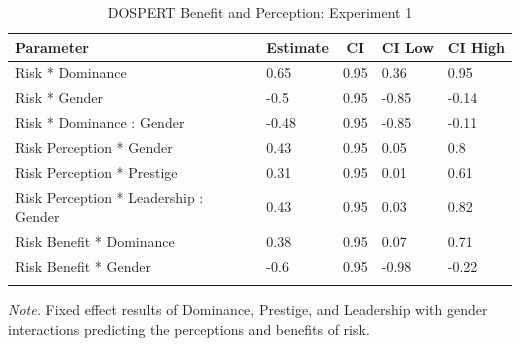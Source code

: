 \documentclass[
  donotrepeattitle,doc, 12pt, a4paper,floatsintext]{apa7}
\begin{document}
\begin{table}[p]

\begin{center}
\begin{threeparttable}

\caption{\label{tab:m5-int-fixef-exp-1}DOSPERT Benefit and Perception: Experiment 1}

\begin{tabular}{lllll}
\toprule
Parameter & \multicolumn{1}{c}{Estimate} & \multicolumn{1}{c}{CI} & \multicolumn{1}{c}{CI Low} & \multicolumn{1}{c}{CI High}\\
\midrule
Risk * Dominance & 0.65 & 0.95 & 0.36 & 0.95\\
Risk * Gender & -0.5 & 0.95 & -0.85 & -0.14\\
Risk * Dominance : Gender & -0.48 & 0.95 & -0.85 & -0.11\\
Risk Perception * Gender & 0.43 & 0.95 & 0.05 & 0.8\\
Risk Perception * Prestige & 0.31 & 0.95 & 0.01 & 0.61\\
Risk Perception * Leadership : Gender & 0.43 & 0.95 & 0.03 & 0.82\\
Risk Benefit * Dominance & 0.38 & 0.95 & 0.07 & 0.71\\
Risk Benefit * Gender & -0.6 & 0.95 & -0.98 & -0.22\\
\bottomrule
\addlinespace
\end{tabular}

\begin{tablenotes}[para]
\normalsize{\textit{Note.} Fixed effect results of Dominance, Prestige, and Leadership with gender interactions predicting the perceptions and benefits of risk.}
\end{tablenotes}

\end{threeparttable}
\end{center}

\end{table}
\end{document}

